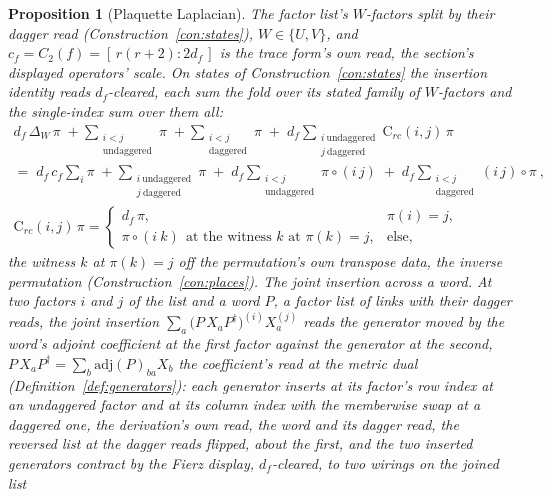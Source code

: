 \documentclass[11pt]{article}
\newtheorem{proposition}{Proposition}
\theoremstyle{definition}
\begin{document}
\begin{proposition}[Plaquette Laplacian]\label{prop:lap}
The factor list's $W$-factors split by their dagger read
(Construction~\ref{con:states}), $W\in\{U,V\}$, and
$c_f=C_2(f)=[\,r(r+2):2d_f\,]$ is the trace
form's own read, the section's displayed operators' scale. On states of
Construction~\ref{con:states} the insertion identity reads
$d_f$-cleared, each sum the fold over its stated family of
$W$-factors and the single-index sum over them all:
\begin{gather*}
d_f\,\Delta_W\,\pi
\;+\!\!\sum_{\substack{i<j\\ \text{undaggered}}}\!\!\pi
\;+\!\!\sum_{\substack{i<j\\ \text{daggered}}}\!\!\pi
\;+\;d_f\!\!\sum_{\substack{i\ \text{undaggered}\\ j\ \text{daggered}}}\!\!\mathrm{C}_{rc}(i,j)\,\pi\\
{}=\;
d_f\,c_f\sum_{i}\pi
\;+\!\!\sum_{\substack{i\ \text{undaggered}\\ j\ \text{daggered}}}\!\!\pi
\;+\;d_f\!\!\sum_{\substack{i<j\\ \text{undaggered}}}\!\!\pi\circ(i\,j)
\;+\;d_f\!\!\sum_{\substack{i<j\\ \text{daggered}}}\!\!(i\,j)\circ\pi\ ,\\
\mathrm{C}_{rc}(i,j)\,\pi=
\begin{cases} d_f\,\pi, & \pi(i)=j,\\[2pt]
\pi\circ(i\ k)\ \ \text{at the witness $k$ at $\pi(k)=j$}, & \text{else,}
\end{cases}
\end{gather*}
the witness $k$ at $\pi(k)=j$ off the permutation's own transpose
data, the inverse permutation (Construction~\ref{con:places}).
\emph{The joint insertion across a word.} At two factors $i$ and $j$
of the list and a \emph{word} $P$, a factor list of links with
their dagger reads, the \emph{joint insertion}
$\sum_a\big(P\,X_aP^{\dagger}\big)^{(i)}X_a^{(j)}$ reads the
generator moved by the word's adjoint coefficient at the first
factor against the generator at the second,
$P\,X_aP^{\dagger}=\sum_b\mathrm{adj}(P)_{ba}X_b$ the coefficient's
read at the metric dual (Definition~\ref{def:generators}): each
generator inserts at its factor's row index at an undaggered
factor and at its column index with the memberwise swap at a
daggered one, the derivation's own read, the word and its dagger
read, the reversed list at the dagger reads flipped, about the
first, and the two inserted generators contract by the Fierz
display, $d_f$-cleared, to two wirings on the joined list

\end{proposition}
\end{document}
